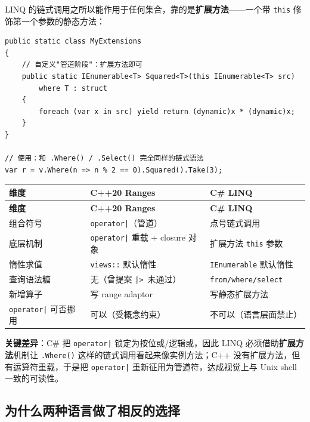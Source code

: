 \documentclass[12pt,a4paper,fontset=fandol]{ctexbook}
\newcommand{\cpp}[1]{C++#1}
\newcommand{\Tp}[1]{\texttt{#1}}
\newcommand{\csharp}{C\#}
\newcommand{\Op}[1]{\texttt{operator#1}}
\begin{document}
LINQ 的链式调用之所以能作用于任何集合，靠的是\textbf{扩展方法}——一个带 \Tp{this} 修饰第一个参数的静态方法：

\begin{lstlisting}[language=CSharp]
public static class MyExtensions
{
    // 自定义"管道阶段"：扩展方法即可
    public static IEnumerable<T> Squared<T>(this IEnumerable<T> src)
        where T : struct
    {
        foreach (var x in src) yield return (dynamic)x * (dynamic)x;
    }
}

// 使用：和 .Where() / .Select() 完全同样的链式语法
var r = v.Where(n => n % 2 == 0).Squared().Take(3);
\end{lstlisting}

\begin{compare}[title=\cpp{20} Ranges 与 \csharp{} LINQ 的设计差异]
\begingroup
\small
\setlength{\tabcolsep}{4pt}
\begin{longtable}{p{3.6cm}p{5.2cm}p{5.2cm}}
\toprule
\textbf{维度} & \textbf{\cpp{20} Ranges} & \textbf{\csharp{} LINQ} \\
\midrule
\endfirsthead
\toprule
\textbf{维度} & \textbf{\cpp{20} Ranges} & \textbf{\csharp{} LINQ} \\
\midrule
\endhead
\bottomrule
\endfoot

组合符号 & \Op{|}（管道） & 点号链式调用 \\
底层机制 & \Op{|} 重载 + closure 对象 & 扩展方法 \Tp{this} 参数 \\
惰性求值 & \Tp{views::} 默认惰性 & \Tp{IEnumerable} 默认惰性 \\
查询语法糖 & 无（曾提案 \texttt{|>}\ 未通过） & \Tp{from/where/select} \\
新增算子 & 写 range adaptor & 写静态扩展方法 \\
\Op{|} 可否挪用 & 可以（受概念约束） & 不可以（语言层面禁止） \\
\end{longtable}
\endgroup

\textbf{关键差异}：\csharp{} 把 \Op{|} 锁定为按位或/逻辑或，因此 LINQ 必须借助\textbf{扩展方法}机制让 \Tp{.Where()} 这样的链式调用看起来像实例方法；\cpp{} 没有扩展方法，但有运算符重载，于是把 \Op{|} 重新征用为管道符，达成视觉上与 Unix shell 一致的可读性。
\end{compare}

\subsection{为什么两种语言做了相反的选择}
\end{document}
